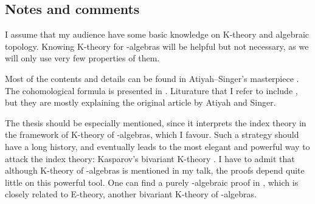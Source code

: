 \documentclass[reqno]{scrartcl}
\theoremstyle{definition}
\newtheorem{definition}[theorem]{Definition}
\theoremstyle{remark}
\begin{document}
\subsection*{Notes and comments}
I assume that my audience have some basic knowledge on K-theory and algebraic topology. Knowing K-theory for \Cst-algebras will be helpful but not necessary, as we will only use very few properties of them.

Most of the contents and details can be found in Atiyah--Singer's masterpiece \cite{atiyahsinger1}. The cohomological formula is presented in \cite{atiyahsinger3}. Liturature that I refer to include \cite{mukherjee2013atiyah,shanahan2006atiyah,landweber2005k}, but they are mostly explaining the original article by Atiyah and Singer.

The thesis \cite{vanerp} should be especially mentioned, since it interprets the index theory in the framework of K-theory of \Cst-algebras, which I favour. Such a strategy should have a long history, and eventually leads to the most elegant and powerful way to attack the index theory: Kasparov's bivariant K-theory \cite{kasparov1988equivariant}. I have to admit that although K-theory of \Cst-algebras is mentioned in my talk, the proofs depend quite little on this powerful tool. One can find a purely \Cst-algebraic proof in \cite{higson1993k}, which is closely related to E-theory, another bivariant K-theory of \Cst-algebras.

\end{document}
